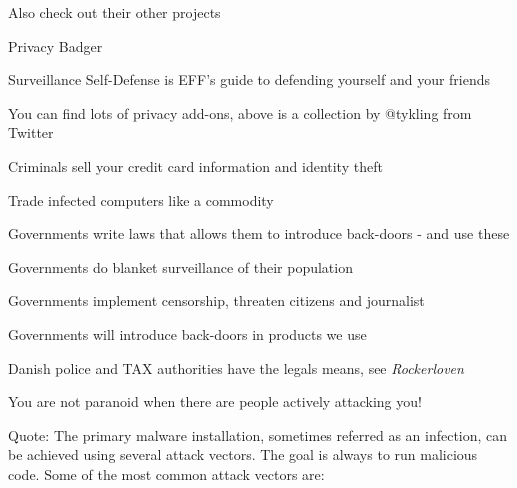\documentclass[20pt,landscape,a4paper,footrule]{foils}
\begin{document}
\begin{list2}
\item Also check out their other projects
\item Privacy Badger 
\item Surveillance Self-Defense is EFF's guide to defending yourself and your friends\\
\end{list2}



You can find lots of privacy add-ons, above is a collection by @tykling from Twitter
{\tiny
{}\\
}




\begin{list2}
\item Criminals sell your credit card information and identity theft
\item Trade infected computers like a commodity
\item Governments write laws that allows them to introduce back-doors - and use these
\item Governments do blanket surveillance of their population
\item Governments implement censorship, threaten citizens and journalist
\item Governments will introduce back-doors in products we use
\item Danish police and TAX authorities have the legals means, see \emph{Rockerloven}
\end{list2}

\vskip 1cm
\centerline{You are not paranoid when there are people actively attacking you!}



Quote:
The primary malware installation, sometimes referred as an infection, can be achieved using several attack vectors. 
The goal is always to run malicious code. Some of the most common attack vectors are:
\end{document}
